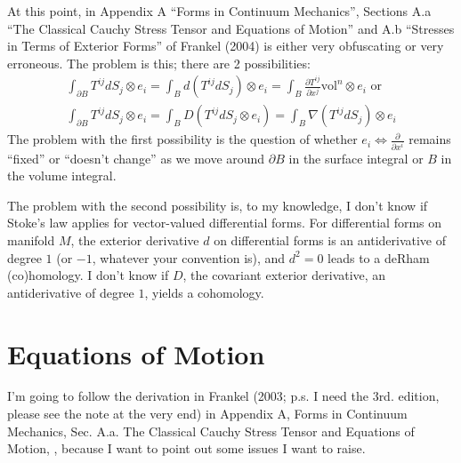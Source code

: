 \documentclass[twoside,landscape,10pt]{amsart}
\theoremstyle{plain}
\theoremstyle{definition}
\theoremstyle{remark}
\begin{document}
\begin{multicols*}{2}
At this point, in Appendix A ``Forms in Continuum Mechanics'', Sections A.a ``The Classical Cauchy Stress Tensor and Equations of Motion'' and A.b ``Stresses in Terms of Exterior Forms'' of Frankel (2004) \cite{TFrankel2004} is either very obfuscating or very erroneous.  The problem is this; there are 2 possibilities:
\begin{equation}\label{Eq:Issuesurfacestress}
\begin{gathered}
  \int_{\partial B} T^{ij} dS_j \otimes e_i = \int_B d(T^{ij}dS_j)\otimes e_i  = \int_B \frac{ \partial T^{ij}}{ \partial x^j} \text{vol}^n \otimes e_i \text{ or } \\
    \int_{\partial B} T^{ij} dS_j \otimes e_i = \int_B D(T^{ij}dS_j \otimes e_i) = \int_B \nabla(T^{ij}dS_j)\otimes e_i
\end{gathered}
\end{equation}
The problem with the first possibility is the question of whether $e_i \Longleftrightarrow \frac{\partial}{\partial x^i}$ remains ``fixed'' or ``doesn't change'' as we move around $\partial B$ in the surface integral or $B$ in the volume integral.  

The problem with the second possibility is, to my knowledge, I don't know if Stoke's law applies for vector-valued differential forms.  For differential forms on manifold $M$, the exterior derivative $d$ on differential forms is an antiderivative of degree $1$ (or $-1$, whatever your convention is), and $d^2=0$ leads to a deRham (co)homology.  I don't know if $D$, the covariant exterior derivative, an antiderivative of degree $1$, yields a cohomology.  

\section{Equations of Motion}

I'm going to follow the derivation in Frankel (2003; p.s. I need the 3rd. edition, please see the note at the very end) in Appendix A, Forms in Continuum Mechanics, Sec. A.a. The Classical Cauchy Stress Tensor and Equations of Motion, \cite{TFrankel2004}, because I want to point out some issues I want to raise.  


\end{multicols*}
\end{document}
